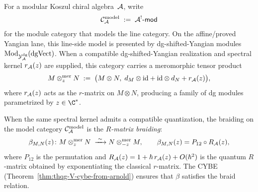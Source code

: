 \begin{definition}
For a modular Koszul chiral algebra~$\mathcal{A}$, write
\begin{equation}%
\cC_\cA^{\mathrm{model}}
\;:=\;
\cA^!\text{-}\mathsf{mod}
\end{equation}
for the module category that models the line category.
On the affine/proved Yangian lane, this line-side model is presented by
dg-shifted-Yangian modules
$\mathrm{Mod}_{\mathcal{Y}^{\mathrm{dg}}_{\mathcal{A}}}(\mathrm{dgVect})$. When a compatible
dg-shifted-Yangian realization and spectral kernel $r_{\mathcal{A}}(z)$ are
supplied, this category carries a meromorphic tensor product
\begin{equation}%
M \otimes^{\mathrm{mer}}_z N
\;:=\;
\bigl(M \otimes N,\;
d_M \otimes \id + \id \otimes d_N + r_\cA(z)\bigr),
\end{equation}
where $r_{\mathcal{A}}(z)$ acts as the $r$-matrix on $M \otimes N$,
producing a family of dg modules parametrized by $z \in \C^*$.

When the same spectral kernel admits a compatible quantization, the
braiding on the model category $\mathcal{C}_{\mathcal{A}}^{\mathrm{model}}$ is the
\emph{$R$-matrix braiding}:
\begin{equation}%
\beta_{M,N}(z)\colon
M \otimes^{\mathrm{mer}}_z N
\;\xrightarrow{\;\sim\;}
N \otimes^{\mathrm{mer}}_{-z} M,
\qquad
\beta_{M,N}(z) = P_{12} \circ R_\cA(z),
\end{equation}
where $P_{12}$ is the permutation and $R_{\mathcal{A}}(z) = 1 + \hbar\,r_{\mathcal{A}}(z) +
O(\hbar^2)$ is the quantum $R$-matrix obtained by exponentiating the
classical $r$-matrix. The CYBE
(Theorem~\ref{thm:thqg-V-cybe-from-arnold}) ensures that $\beta$
satisfies the braid relation.
\end{definition}

